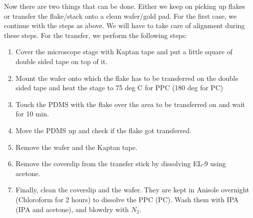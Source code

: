 Now there are two things that can be done. Either we keep on picking up flakes or transfer the flake/stack onto a clean wafer/gold pad. For the first case, we continue with the steps as above. We will have to take care of alignment during these steps. For the transfer, we perform the following steps:
\begin{enumerate}
\item Cover the microscope stage with Kaptan tape and put a little square of double sided tape on top of it.
\item Mount the wafer onto which the flake has to be transferred on the double sided tape and heat the stage to 75 deg C for PPC (180 deg for PC)
\item Touch the PDMS with the flake over the area to be transferred on and wait for 10 min.
\item Move the PDMS up and check if the flake got transferred.
\item Remove the wafer and the Kaptan tape.
\item Remove the coverslip from the transfer stick by dissolving EL-9 using acetone.
\item Finally, clean the coverslip and the wafer. They are kept in Anisole overnight (Chloroform for 2 hours) to dissolve the PPC (PC). Wash them with IPA (IPA and acetone), and blowdry with $N_2$.
\end{enumerate}
